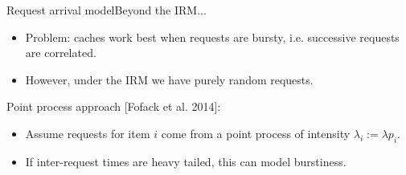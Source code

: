 \documentclass[aspectratio=169]{beamer}
\newenvironment*{myitem}[1][1.5em]{\begin{itemize}\setlength{\itemsep}{#1}}{\end{itemize}}
\begin{document}
\begin{frame}{Request arrival model}{Beyond the IRM...}

	\begin{myitem}
		\item \alert{Problem:} caches work best when requests are \alert{bursty}, i.e. successive requests are \alert{correlated}.
		
		\item However, under the IRM we have purely random requests.
	\end{myitem}

	\vfill

	\alert{Point process approach [Fofack et al. 2014]:}

	\vfill
	\begin{myitem}
		\item Assume requests for item $i$ come from a \alert{point process} of intensity $\lambda_i := \lambda p_i$.
		
		\item If inter-request times are \alert{heavy tailed}, this can model burstiness.
	\end{myitem}
\end{frame}
\end{document}
